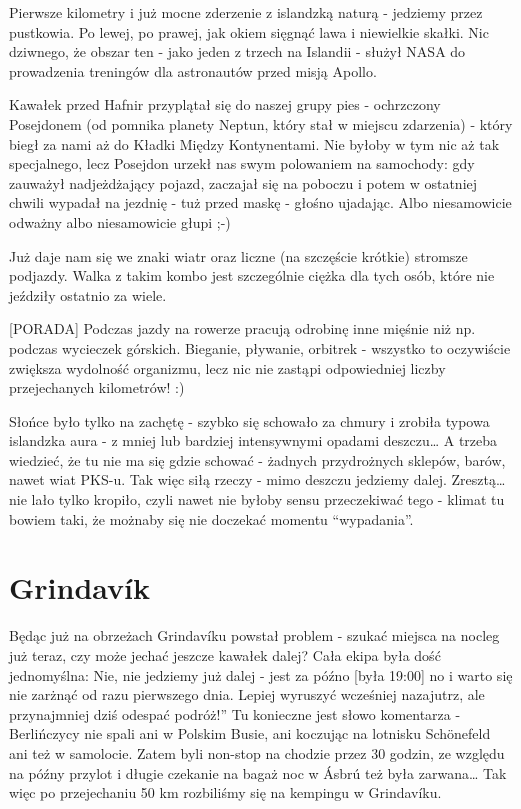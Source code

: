 \documentclass[12pt,a4paper,leqno]{book}
\newcommand{\hint}[1] {
	\vspace{6pt}
	[PORADA] #1
	\vspace{6pt}
}
\begin{document}
Pierwsze kilometry i już mocne zderzenie z islandzką naturą - jedziemy przez pustkowia. Po lewej, po prawej, jak okiem sięgnąć lawa i niewielkie skałki. Nic dziwnego, że obszar ten - jako jeden z trzech na Islandii - służył NASA do prowadzenia treningów dla astronautów przed misją Apollo.

Kawałek przed Hafnir przyplątał się do naszej grupy pies - ochrzczony Posejdonem (od pomnika planety Neptun, który stał w miejscu zdarzenia) - który biegł za nami aż do Kładki Między Kontynentami. Nie byłoby w tym nic aż tak specjalnego, lecz Posejdon urzekł nas swym polowaniem na samochody: gdy zauważył nadjeżdżający pojazd, zaczajał się na poboczu i potem w ostatniej chwili wypadał na jezdnię - tuż przed maskę - głośno ujadając. Albo niesamowicie odważny albo niesamowicie głupi ;-)

Już daje nam się we znaki wiatr oraz liczne (na szczęście krótkie) stromsze podjazdy. Walka z takim kombo jest szczególnie ciężka dla tych osób, które nie jeździły ostatnio za wiele.

\hint{Podczas jazdy na rowerze pracują odrobinę inne mięśnie niż np. podczas wycieczek górskich. Bieganie, pływanie, orbitrek - wszystko to oczywiście zwiększa wydolność organizmu, lecz nic nie zastąpi odpowiedniej liczby przejechanych kilometrów! :)}

Słońce było tylko na zachętę - szybko się schowało za chmury i zrobiła typowa islandzka aura - z mniej lub bardziej intensywnymi opadami deszczu… A trzeba wiedzieć, że tu nie ma się gdzie schować - żadnych przydrożnych sklepów, barów, nawet wiat PKS-u. Tak więc siłą rzeczy - mimo deszczu jedziemy dalej. Zresztą… nie lało tylko kropiło, czyli nawet nie byłoby sensu przeczekiwać tego - klimat tu bowiem taki, że możnaby się nie doczekać momentu “wypadania”.

\section{Grindavík}

Będąc już na obrzeżach Grindavíku powstał problem - szukać miejsca na nocleg już teraz, czy może jechać jeszcze kawałek dalej? Cała ekipa była dość jednomyślna: Nie, nie jedziemy już dalej - jest za późno [była 19:00] no i warto się nie zarżnąć od razu pierwszego dnia. Lepiej wyruszyć wcześniej nazajutrz, ale przynajmniej dziś odespać podróż!” Tu konieczne jest słowo komentarza - Berlińczycy nie spali ani w Polskim Busie, ani koczując na lotnisku Schönefeld ani też w samolocie. Zatem byli non-stop na chodzie przez 30 godzin, ze względu na późny przylot i długie czekanie na bagaż noc w Ásbrú też była zarwana… Tak więc po przejechaniu 50 km rozbiliśmy się na kempingu w Grindavíku.
\end{document}

